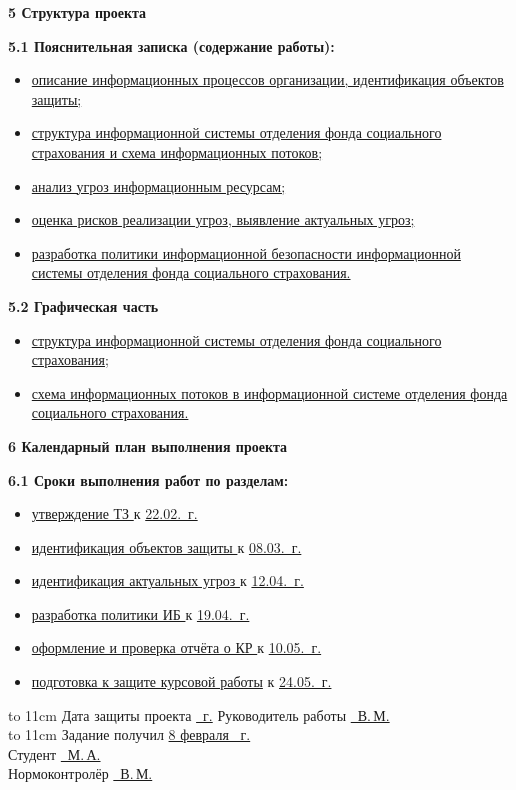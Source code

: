 \begin{singlespace}
  \textbf{5 Структура проекта}

  \textbf{5.1 Пояснительная записка (содержание работы):}

  \begin{itemize}
  \item \uline{описание информационных процессов организации,
      иденти\-фикация объектов защиты;\hfill\quad}
  \item \uline{структура информационной системы отделения фонда
      соци\-ального страхования и схема информационных
      потоков;\hfill\quad}
  \item \uline{анализ угроз информационным ресурсам;\hfill\quad}
  \item \uline{оценка рисков реализации угроз, выявление актуальных
      уг\-роз;\hfill\quad}
  \item \uline {разработка политики информационной безопасности
      инфор\-мационной системы отделения фонда социального
      страхова\-ния.\hfill\quad}
  \end{itemize}

  \textbf{5.2 Графическая часть}
  \begin{itemize}
  \item \uline{структура информационной системы отделения фонда
      соци\-ального страхования;\hfill\quad}
  \item \uline{схема информационных потоков в информационной системе
      отделения фонда социального страхования.\hfill\quad}
  \end{itemize}

  \textbf{6 Календарный план выполнения проекта}

  \textbf{6.1 Сроки выполнения работ по разделам:}

  \begin{itemize}
  \item \uline{утверждение ТЗ \hfill} к \uline{22.02.\the\year~г. }
  \item \uline{идентификация объектов защиты \hfill} к
    \uline{08.03.\the\year~г.}
  \item \uline{идентификация актуальных угроз \hfill} к
    \uline{12.04.\the\year~г.}
  \item \uline{разработка политики ИБ \hfill}
    к \uline{19.04.\the\year~г.}
  \item \uline{оформление и проверка отчёта о КР \hfill}
    к \uline{10.05.\the\year~г.}
  \item \uline{подготовка к защите курсовой работы\hfill} к
    \uline{24.05.\the\year~г.}
  \end{itemize}
  \hbox to 11cm {Дата защиты проекта \uline{\hfill \the\year~г.}}
  Руководитель работы \uline{~В.\,М.}\\
  \hbox to 11cm {Задание получил \uline{\hfill8 февраля \the\year~г.}}\\
  Студент    \uline{~М.\,А.}\\
  Нормоконтролёр    \uline{~В.\,М.}\\
\end{singlespace}
\newpage

